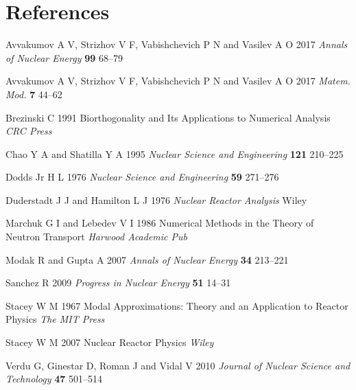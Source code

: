 \documentclass[a4paper]{jpconf}
\begin{document}
\section*{References}
\begin{thebibliography}{50}
Avvakumov A V, Strizhov V F, Vabishchevich P N and Vasilev A O 2017
{\it Annals of Nuclear Energy} {\bf 99} 68--79

Avvakumov A V, Strizhov V F, Vabishchevich P N and Vasilev A O 2017
{\it Matem. Mod.} {\bf 7} 44--62

Brezinski C 1991
Biorthogonality and Its Applications to Numerical Analysis 
{\it CRC Press}

Chao Y A and Shatilla Y A 1995
{\it Nuclear Science and  Engineering} {\bf 121} 210--225

Dodds Jr H L 1976
{\it Nuclear Science and Engineering} {\bf 59} 271--276

Duderstadt J J and Hamilton L J 1976
{\it Nuclear Reactor Analysis} Wiley

Marchuk G I and Lebedev V I 1986
Numerical Methods in the Theory of Neutron Transport
{\it Harwood Academic Pub}

Modak R and Gupta A 2007
{\it Annals of Nuclear Energy} {\bf 34} 213--221

Sanchez R 2009
{\it Progress in Nuclear Energy} {\bf 51} 14--31

Stacey W M 1967
Modal Approximations: Theory and an Application to Reactor Physics
{\it The MIT Press}

Stacey W M 2007
Nuclear Reactor Physics
{\it Wiley}

Verdu G, Ginestar D, Roman J and Vidal V 2010
{\it Journal of Nuclear Science and Technology} {\bf 47} 501--514
\end{thebibliography}
\end{document}

